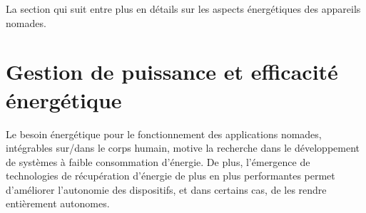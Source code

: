 La section qui suit entre plus en détails sur les aspects énergétiques des appareils nomades.
\section{Gestion de puissance et efficacité énergétique}
\label{sec:1.3_Gestion de puissance et efficacite energetique}
Le besoin énergétique pour le fonctionnement des applications nomades, intégrables sur/dans le corps humain, motive la recherche dans le développement de systèmes à faible consommation d'énergie. De plus, l'émergence de technologies de récupération d'énergie de plus en plus performantes permet d'améliorer l'autonomie des dispositifs, et dans certains cas, de les rendre entièrement autonomes. 

